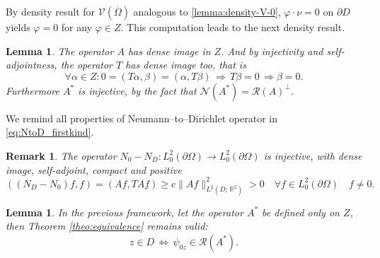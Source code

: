 \documentclass[10pt, a4paper, twoside, openright]{book}
\theoremstyle{definition}
\theoremstyle{plain}
\theoremstyle{plain}
\theoremstyle{plain}
\theoremstyle{plain}
\newtheorem{remark}[subsection]{Remark}
\theoremstyle{plain}
\newtheorem{lemma}[subsection]{Lemma}
\theoremstyle{plain}
\theoremstyle{plain}
\theoremstyle{plain}
\let\phi\varphi
\begin{document}
By density result for $\mathcal{V}(\overline{\Omega})$ analogous to \ref{lemma:density-V-0}, $\phi\cdot \nu=0$ on $\partial D$ yields $\phi=0$ for any $\phi\in Z$.
This computation leads to the next density result.
\begin{lemma}
 The operator $A$ has dense image in $Z$. And by injectivity and self-adjointness, the operator $T$ has dense image too, that is
 \begin{equation}
  \forall\alpha\in Z: 0=(T\alpha,\beta)=(\alpha,T\beta)\,\Rightarrow \, T\beta = 0 \, \Rightarrow \beta=0.
 \end{equation}
 Furthermore $A^*$ is injective, by the fact that $\mathcal{N}(A^*)=\mathcal{R}(A)^\perp$.
\end{lemma}
We remind all properties of Neumann--to--Dirichlet operator in \eqref{eq:NtoD_firstkind}.
\begin{remark}
 The operator ${N_0} - {N_D}: L^2_0(\partial \Omega) \to L^2_0(\partial \Omega)$ is injective, with dense image, self-adjoint, compact and positive
 \begin{equation}
  (({N_D} - {N_0})f,f) = ( Af,TAf) \geq c\|Af\|^2_{L^2(D;\,\mathbb{R}^2)} > 0 \quad \forall f\in L^2_0(\partial \Omega) \quad f\neq0.
 \end{equation} 
\end{remark}
\begin{lemma}
 In the previous framework, let the operator $A^*$ be defined only on $Z$, then Theorem \ref{theo:equivalence} remains valid:
  \begin{equation}
  z \in D \,\Longleftrightarrow \,\psi_{0z} \in \mathcal{R}(A^*).
 \end{equation}
\end{lemma}
\end{document}
